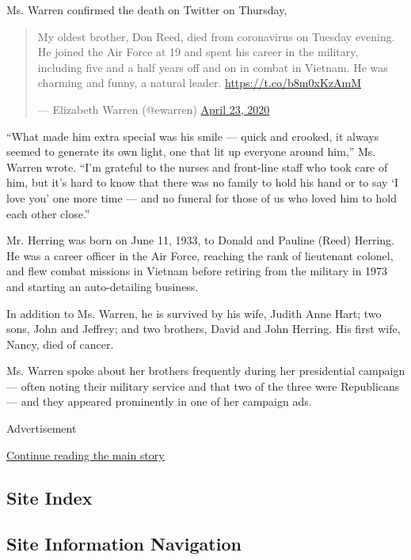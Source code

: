 Ms. Warren confirmed the death on Twitter on Thursday,

\begin{quote}
My oldest brother, Don Reed, died from coronavirus on Tuesday evening.
He joined the Air Force at 19 and spent his career in the military,
including five and a half years off and on in combat in Vietnam. He was
charming and funny, a natural leader. \url{https://t.co/b8m0xKzAmM}

--- Elizabeth Warren (@ewarren)
\href{https://twitter.com/ewarren/status/1253332675315724289?ref_src=twsrc\%5Etfw}{April
23, 2020}
\end{quote}

``What made him extra special was his smile --- quick and crooked, it
always seemed to generate its own light, one that lit up everyone around
him,'' Ms. Warren wrote. ``I'm grateful to the nurses and front-line
staff who took care of him, but it's hard to know that there was no
family to hold his hand or to say `I love you' one more time --- and no
funeral for those of us who loved him to hold each other close.''

Mr. Herring was born on June 11, 1933, to Donald and Pauline (Reed)
Herring. He was a career officer in the Air Force, reaching the rank of
lieutenant colonel, and flew combat missions in Vietnam before retiring
from the military in 1973 and starting an auto-detailing business.

In addition to Ms. Warren, he is survived by his wife, Judith Anne Hart;
two sons, John and Jeffrey; and two brothers, David and John Herring.
His first wife, Nancy, died of cancer.

Ms. Warren spoke about her brothers frequently during her presidential
campaign --- often noting their military service and that two of the
three were Republicans --- and they appeared prominently in one of her
campaign ads.

Advertisement

\protect\hyperlink{after-bottom}{Continue reading the main story}

\hypertarget{site-index}{%
\subsection{Site Index}\label{site-index}}

\hypertarget{site-information-navigation}{%
\subsection{Site Information
Navigation}\label{site-information-navigation}}

